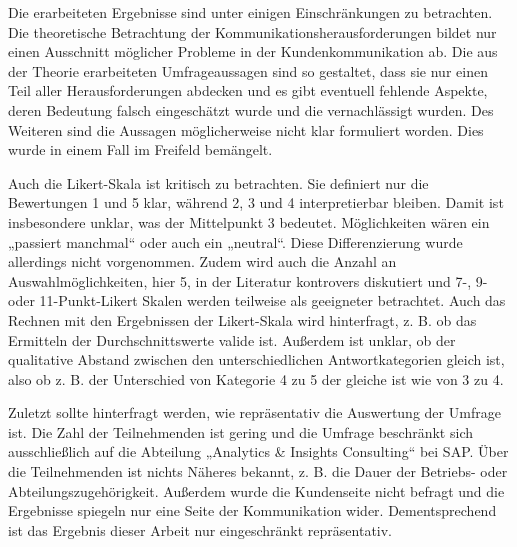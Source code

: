 \documentclass[../main.tex]{subfiles}
\begin{document}
Die erarbeiteten Ergebnisse sind unter einigen Einschränkungen zu betrachten. 
Die theoretische Betrachtung der Kommunikationsherausforderungen bildet nur einen Ausschnitt möglicher Probleme in der Kundenkommunikation ab. 
Die aus der Theorie erarbeiteten Umfrageaussagen sind so gestaltet, dass sie nur einen Teil aller Herausforderungen abdecken und es gibt eventuell fehlende Aspekte, deren Bedeutung falsch eingeschätzt wurde und die vernachlässigt wurden. 
Des Weiteren sind die Aussagen möglicherweise nicht klar formuliert worden. 
Dies wurde in einem Fall im Freifeld bemängelt.

Auch die Likert-Skala ist kritisch zu betrachten. 
Sie definiert nur die Bewertungen 1 und 5 klar, während 2, 3 und 4 interpretierbar bleiben. 
Damit ist insbesondere unklar, was der Mittelpunkt 3 bedeutet. 
Möglichkeiten wären ein „passiert manchmal“ oder auch ein „neutral“. 
Diese Differenzierung wurde allerdings nicht vorgenommen. 
Zudem wird auch die Anzahl an Auswahlmöglichkeiten, hier 5, in der Literatur kontrovers diskutiert und 7-, 9- oder 11-Punkt-Likert Skalen werden teilweise als geeigneter betrachtet. 
Auch das Rechnen mit den Ergebnissen der Likert-Skala wird hinterfragt, z. B. ob das Ermitteln der Durchschnittswerte valide ist. 
Außerdem ist unklar, ob der qualitative Abstand zwischen den unterschiedlichen Antwortkategorien gleich ist, also ob z. B. der Unterschied von Kategorie 4 zu 5 der gleiche ist wie von 3 zu 4.
\autocite{tanujaya2022likert}

Zuletzt sollte hinterfragt werden, wie repräsentativ die Auswertung der Umfrage ist.
Die Zahl der Teilnehmenden ist gering und die Umfrage beschränkt sich ausschließlich auf die Abteilung „Analytics \& Insights Consulting“ bei SAP. 
Über die Teilnehmenden ist nichts Näheres bekannt, z. B. die Dauer der Betriebs- oder Abteilungszugehörigkeit. 
Außerdem wurde die Kundenseite nicht befragt und die Ergebnisse spiegeln nur eine Seite der Kommunikation wider. 
Dementsprechend ist das Ergebnis dieser Arbeit nur eingeschränkt repräsentativ.
\end{document}
